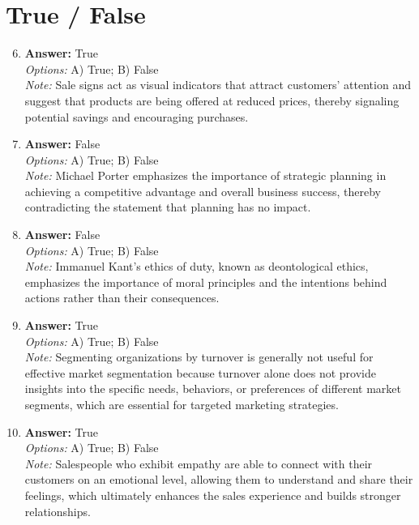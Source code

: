 \documentclass[12pt]{article}
\begin{document}
\section*{True / False}
\begin{enumerate}[label=\arabic*.]
\setcounter{enumi}{5}
\item \textbf{Answer:} True
\\ \textit{Options:} A) True; B) False
\\ \textit{Note:} Sale signs act as visual indicators that attract customers' attention and suggest that products are being offered at reduced prices, thereby signaling potential savings and encouraging purchases.
\item \textbf{Answer:} False
\\ \textit{Options:} A) True; B) False
\\ \textit{Note:} Michael Porter emphasizes the importance of strategic planning in achieving a competitive advantage and overall business success, thereby contradicting the statement that planning has no impact.
\item \textbf{Answer:} False
\\ \textit{Options:} A) True; B) False
\\ \textit{Note:} Immanuel Kant's ethics of duty, known as deontological ethics, emphasizes the importance of moral principles and the intentions behind actions rather than their consequences.
\item \textbf{Answer:} True
\\ \textit{Options:} A) True; B) False
\\ \textit{Note:} Segmenting organizations by turnover is generally not useful for effective market segmentation because turnover alone does not provide insights into the specific needs, behaviors, or preferences of different market segments, which are essential for targeted marketing strategies.
\item \textbf{Answer:} True
\\ \textit{Options:} A) True; B) False
\\ \textit{Note:} Salespeople who exhibit empathy are able to connect with their customers on an emotional level, allowing them to understand and share their feelings, which ultimately enhances the sales experience and builds stronger relationships.
\end{enumerate}
\end{document}
